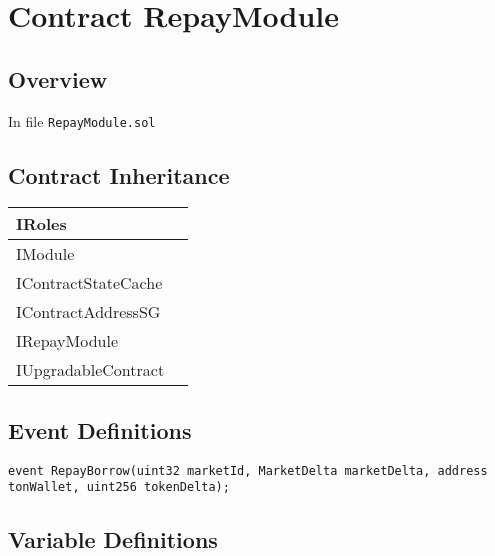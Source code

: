
\chapter{Contract RepayModule}

\minitoc

\section{Overview}


In file {\tt RepayModule.sol}

\section{Contract Inheritance}


\noindent\begin{tabular}{|l|p{5cm}|}\hline
IRoles & \\\hline
IModule & \\\hline
IContractStateCache & \\\hline
IContractAddressSG & \\\hline
IRepayModule & \\\hline
IUpgradableContract & \\\hline
\end{tabular}


\section{Event Definitions}


\begin{lstlisting}[firstnumber=18]
    event RepayBorrow(uint32 marketId, MarketDelta marketDelta, address tonWallet, uint256 tokenDelta);
\end{lstlisting}

\section{Variable Definitions}


